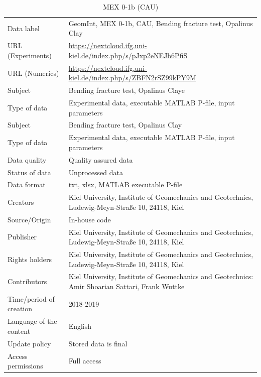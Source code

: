 \begin{table}[!ht]
\caption{MEX 0-1b (CAU)}
\label{tab:dms-mex0-1b}
\small
\begin{tabular}{R{3.5cm}|L{7.5cm}}
\hline
%
Data label & GeomInt, MEX 0-1b, CAU, Bending fracture test, Opalinus Clay \\
URL (Experiments) & \url{https://nextcloud.ifg.uni-kiel.de/index.php/s/pJxp2eNEJb6PfiS} \\
URL (Numerics) & \url{https://nextcloud.ifg.uni-kiel.de/index.php/s/ZBFN2rSZ99kPY9M} \\
Subject  &  Bending fracture test, Opalinus Claye\\
Type of data  &  Experimental data, executable MATLAB P-file, input parameters\\
Subject  &  Bending fracture test, Opalinus Clay\\
Type of data  &  Experimental data, executable MATLAB P-file, input parameters\\
Data quality  &  Quality assured data \\
Status of data  &  Unprocessed data\\
Data format  & txt, xlsx, MATLAB executable P-file\\
Creators  &  Kiel University, Institute of Geomechanics and Geotechnics, Ludewig-Meyn-Stra\ss e 10, 24118, Kiel\\
Source/Origin & In-house code \\
Publisher  &  Kiel University, Institute of Geomechanics and Geotechnics, Ludewig-Meyn-Stra\ss e 10, 24118, Kiel \\
Rights holders &  Kiel University, Institute of Geomechanics and Geotechnics, Ludewig-Meyn-Stra\ss e 10, 24118, Kiel \\
Contributors &   Kiel University, Institute of Geomechanics and Geotechnics: Amir Shoarian Sattari, Frank Wuttke\\
Time/period of creation &  2018-2019\\
Language of the content &  English\\
Update policy &  Stored data is final\\
Access permissions & Full access\\
%
\hline
\end{tabular}
\end{table}


